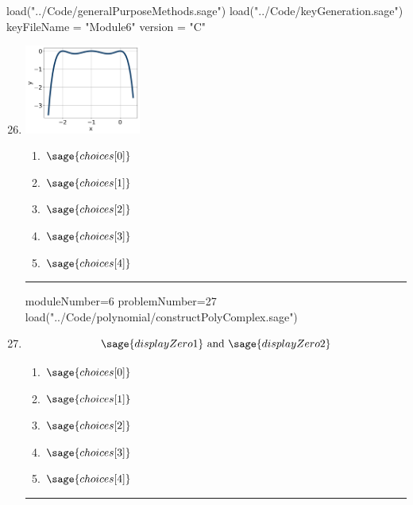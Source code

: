 \documentclass[14pt]{article}
\newcommand{\litem}[1]{\item#1\hspace*{-1cm}\rule{\textwidth}{0.4pt}}
\begin{document}
\pagestyle{fancy}

\begin{sagesilent}
load("../Code/generalPurposeMethods.sage")
load("../Code/keyGeneration.sage")
keyFileName = "Module6"
version = "C"
\end{sagesilent}

\begin{enumerate}
\setcounter{enumi}{25}


\begin{sagesilent}
moduleNumber=6
problemNumber=26
load("../Code/polynomial/polyGraphToFunction.sage")
\end{sagesilent}

\litem{ 

	\begin{center}
	\includegraphics[width = 0.3\textwidth]{../Figures/polyGraphToFunctionC.png}
	\end{center}

	\begin{enumerate}[label=\Alph*.]
		\item \( \sage{choices[0]} \)
		\item \( \sage{choices[1]} \)
		\item \( \sage{choices[2]} \)
		\item \( \sage{choices[3]} \)
		\item \( \sage{choices[4]} \)
	\end{enumerate}
}

\begin{sagesilent}
moduleNumber=6
problemNumber=27
load("../Code/polynomial/constructPolyComplex.sage")
\end{sagesilent}

\litem{	

	\[ \sage{displayZero1} \text{ and } \sage{displayZero2} \]

	\begin{enumerate}[label=\Alph*.]
		\item \( \sage{choices[0]} \)
		\item \( \sage{choices[1]} \)
		\item \( \sage{choices[2]} \)
		\item \( \sage{choices[3]} \)
		\item \( \sage{choices[4]} \)
	\end{enumerate}
}


\end{enumerate}
\end{document}

